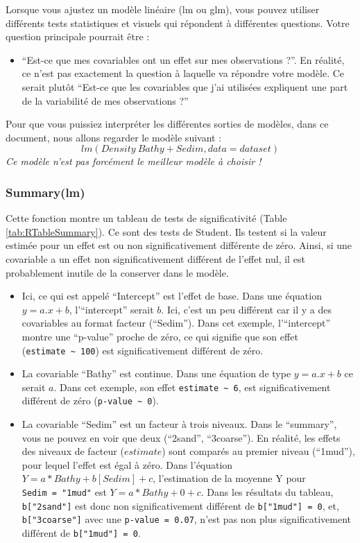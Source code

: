 \documentclass[french,a4paper]{article}
\providecommand{\tightlist}{%
  \setlength{\itemsep}{0pt}\setlength{\parskip}{0pt}}
\begin{document}
Lorsque vous ajustez un modèle linéaire (lm ou glm), vous pouvez utiliser différents tests statistiques et visuels qui répondent à différentes questions. Votre question principale pourrait être :

\begin{itemize}
\tightlist
\item
  ``Est-ce que mes covariables ont un effet sur mes observations ?''. En réalité, ce n'est pas exactement la question à laquelle va répondre votre modèle. Ce serait plutôt ``Est-ce que les covariables que j'ai utilisées expliquent une part de la variabilité de mes observations ?''
\end{itemize}

Pour que vous puissiez interpréter les différentes sorties de modèles, dans ce document, nous allons regarder le modèle suivant :
\[lm(Density ~ Bathy + Sedim, data = dataset)\]
\emph{Ce modèle n'est pas forcément le meilleur modèle à choisir !}

\hypertarget{summarylm}{%
\subsubsection{Summary(lm)}\label{summarylm}}

Cette fonction montre un tableau de tests de significativité (Table \ref{tab:RTableSummary}). Ce sont des tests de Student. Ils testent si la valeur estimée pour un effet est ou non significativement différente de zéro. Ainsi, si une covariable a un effet non significativement différent de l'effet nul, il est probablement inutile de la conserver dans le modèle.

\begin{itemize}
\tightlist
\item
  Ici, ce qui est appelé ``Intercept'' est l'effet de base. Dans une équation \(y = a.x + b\), l'``intercept'' serait \(b\). Ici, c'est un peu différent car il y a des covariables au format facteur (``Sedim''). Dans cet exemple, l'``intercept'' montre une ``p-value'' proche de zéro, ce qui signifie que son effet (\texttt{estimate\ \textasciitilde{}\ 100}) est significativement différent de zéro.
\item
  La covariable ``Bathy'' est continue. Dans une équation de type \(y = a.x + b\) ce serait \(a\). Dans cet exemple, son effet \texttt{estimate\ \textasciitilde{}\ 6}, est significativement différent de zéro (\texttt{p-value\ \textasciitilde{}\ 0}).
\item
  La covariable ``Sedim'' est un facteur à trois niveaux. Dans le ``summary'', vous ne pouvez en voir que deux (``2sand'', ``3coarse''). En réalité, les effets des niveaux de facteur (\(estimate\)) sont comparés au premier niveau (``1mud''), pour lequel l'effet est égal à zéro. Dans l'équation \(Y = a*Bathy + b[Sedim] + c\), l'estimation de la moyenne Y pour \texttt{Sedim\ =\ "1mud"} est \(Y = a*Bathy + 0 + c\). Dans les résultats du tableau, \texttt{b{[}"2sand"{]}} est donc non significativement différent de \texttt{b{[}"1mud"{]}\ =\ 0}, et, \texttt{b{[}"3coarse"{]}} avec une \texttt{p-value\ =\ 0.07}, n'est pas non plus significativement différent de \texttt{b{[}"1mud"{]}\ =\ 0}.
\end{itemize}
\end{document}
